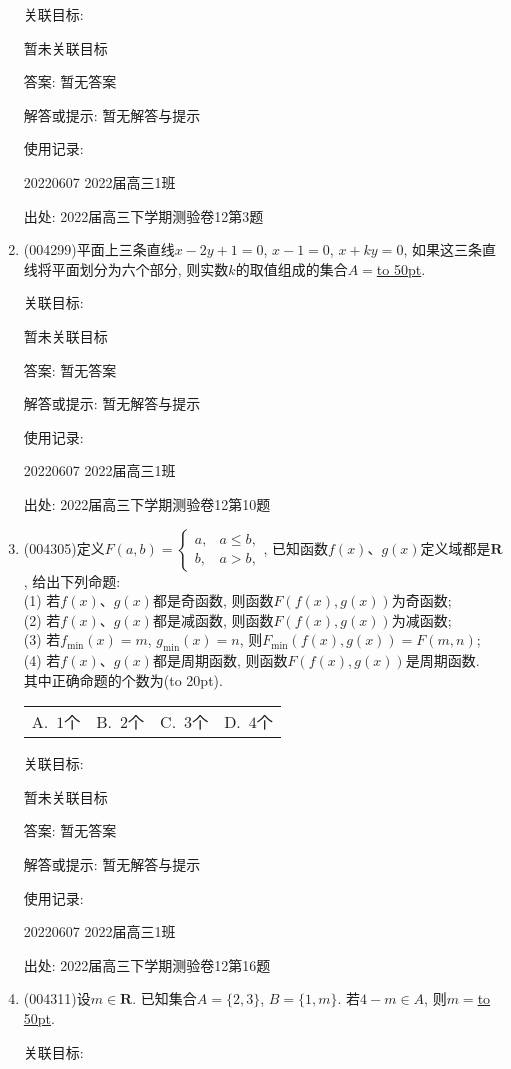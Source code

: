 \documentclass[10pt,a4paper]{article}
\newcommand{\blank}[1]{\underline{\hbox to #1pt{}}}
\newcommand{\bracket}[1]{(\hbox to #1pt{})}
\newcommand{\fourch}[4]{\par\begin{tabular}{p{.23\textwidth}p{.23\textwidth}p{.23\textwidth}p{.23\textwidth}}
A.~#1 &B.~#2& C.~#3& D.~#4
\end{tabular}}
\begin{document}
\begin{enumerate}[1.]
关联目标:

暂未关联目标

答案: 暂无答案

解答或提示: 暂无解答与提示

使用记录:

20220607	2022届高三1班	


出处: 2022届高三下学期测验卷12第3题
\item { (004299)}平面上三条直线$x-2y+1=0$, $x-1=0$, $x+ky=0$, 如果这三条直线将平面划分为六个部分, 则实数$k$的取值组成的集合$A=$\blank{50}.


关联目标:

暂未关联目标

答案: 暂无答案

解答或提示: 暂无解答与提示

使用记录:

20220607	2022届高三1班	


出处: 2022届高三下学期测验卷12第10题
\item { (004305)}定义$F(a,b)=\begin{cases} a, & a \le b, \\ b, & a>b,\end{cases}$, 已知函数$f(x)$、$g(x)$定义域都是$\mathbf{R}$, 给出下列命题:\\
(1) 若$f(x)$、$g(x)$都是奇函数, 则函数$F(f(x),g(x))$为奇函数;\\
(2) 若$f(x)$、$g(x)$都是减函数, 则函数$F(f(x),g(x))$为减函数;\\
(3) 若$f_{\min}(x)=m$, $g_{\min}(x)=n$, 则$F_{\min}(f(x),g(x))=F(m,n)$;\\
(4) 若$f(x)$、$g(x)$都是周期函数, 则函数$F(f(x),g(x))$是周期函数.\\
其中正确命题的个数为\bracket{20}.
\fourch{$1$个}{$2$个}{$3$个}{$4$个}


关联目标:

暂未关联目标

答案: 暂无答案

解答或提示: 暂无解答与提示

使用记录:

20220607	2022届高三1班	


出处: 2022届高三下学期测验卷12第16题
\item { (004311)}设$m\in \mathbf{R}$. 已知集合$A=\{2,3\}$, $B=\{1,m\}$. 若$4-m\in A$, 则$m=$\blank{50}.


关联目标:


\end{enumerate}
\end{document}
